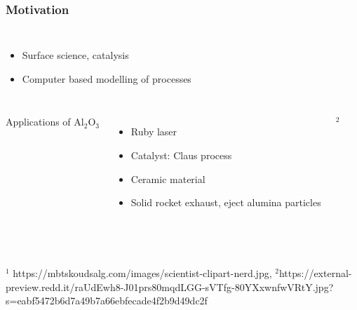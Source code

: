 \documentclass[hyperref={pdfpagelabels=false}]{beamer}
\begin{document}
\begin{frame}
 \frametitle{Motivation}
 \begin{columns}[c]
  \begin{itemize}
   \item Surface science, catalysis
   \item Computer based modelling of processes
  \end{itemize}
 \end{columns}
 \pause
 \begin{columns}[c]
  Applications of Al$_2$O$_3$
  \begin{itemize}
   \item Ruby laser
   \item Catalyst: Claus process
   \item Ceramic material
   \item Solid rocket exhaust, eject alumina particles
  \end{itemize}
   \tiny{$^2$} %
 \end{columns}
 ~\\
 \pause
 \\
 \tiny{$^1$ https://mbtskoudsalg.com/images/scientist-clipart-nerd.jpg, 
 $^2$https://external-preview.redd.it/raUdEwh8-J01prs80mqdLGG-sVTfg-80YXxwnfwVRtY.jpg?s=eabf5472b6d7a49b7a66ebfecade4f2b9d49dc2f}
\end{frame}
\end{document}
